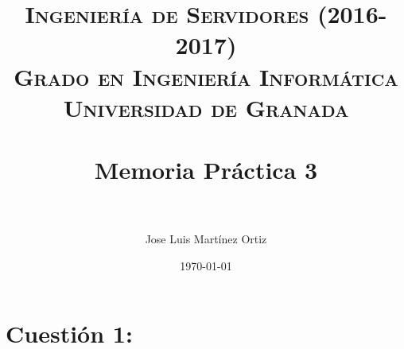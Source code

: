 


\title{	
\normalfont \normalsize 
\textsc{\textbf{Ingeniería de Servidores (2016-2017)} \\ Grado en Ingeniería Informática \\ Universidad de Granada} \\ [25pt] %
\horrule{0.5pt} \\[0.4cm] %
\huge Memoria Práctica 3 \\ %
\horrule{2pt} \\[0.5cm] %
}

\author{Jose Luis Martínez Ortiz} %

\date{\normalsize\today} %




\maketitle %

\newpage %

\tableofcontents %

\listoffigures

\listoftables

\newpage

 
\newpage


\section{Cuestión 1:}
